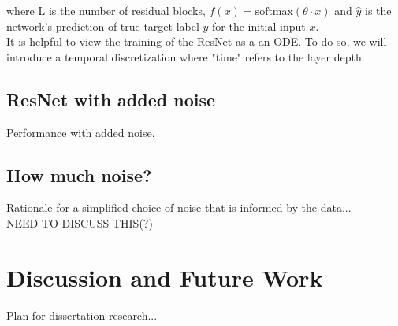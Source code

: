 \documentclass[12pt]{article}
\begin{document}
where L is the number of residual blocks, $f(x) = \text{softmax}(\theta \cdot x)$ and $\hat y$ is the network's prediction of true target label $y$ for the initial input $x$. \\
\indent It is helpful to view the training of the ResNet as a an ODE. To do so, we will introduce a temporal discretization where "time" refers to the layer depth.
\subsection{ResNet with added noise}
Performance with added noise.
\subsection{How much noise?}
Rationale for a simplified choice of noise that is informed by the data...\\
NEED TO DISCUSS THIS(?)
\section{Discussion and Future Work}
Plan for dissertation research...

\end{document}
